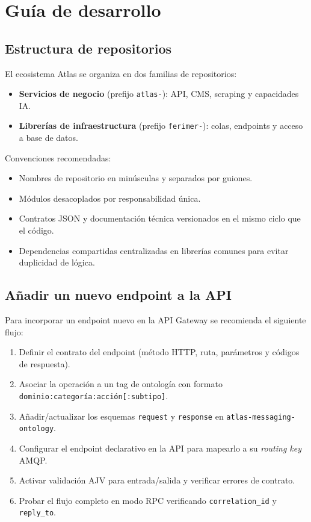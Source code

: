 \chapter{Guía de desarrollo}
\label{cap:desarrollo}

\section{Estructura de repositorios}

El ecosistema Atlas se organiza en dos familias de repositorios:

\begin{itemize}
\item \textbf{Servicios de negocio} (prefijo \texttt{atlas-}): API, CMS, scraping y capacidades IA.
\item \textbf{Librerías de infraestructura} (prefijo \texttt{ferimer-}): colas, endpoints y acceso a base de datos.
\end{itemize}

Convenciones recomendadas:

\begin{itemize}
\item Nombres de repositorio en minúsculas y separados por guiones.
\item Módulos desacoplados por responsabilidad única.
\item Contratos JSON y documentación técnica versionados en el mismo ciclo que el código.
\item Dependencias compartidas centralizadas en librerías comunes para evitar duplicidad de lógica.
\end{itemize}

\section{Añadir un nuevo endpoint a la API}

Para incorporar un endpoint nuevo en la API Gateway se recomienda el siguiente flujo:

\begin{enumerate}
\item Definir el contrato del endpoint (método HTTP, ruta, parámetros y códigos de respuesta).
\item Asociar la operación a un tag de ontología con formato \texttt{dominio:categoría:acción[:subtipo]}.
\item Añadir/actualizar los esquemas \texttt{request} y \texttt{response} en \texttt{atlas-messaging-ontology}.
\item Configurar el endpoint declarativo en la API para mapearlo a su \textit{routing key} AMQP.
\item Activar validación AJV para entrada/salida y verificar errores de contrato.
\item Probar el flujo completo en modo RPC verificando \texttt{correlation\_id} y \texttt{reply\_to}.
\end{enumerate}

